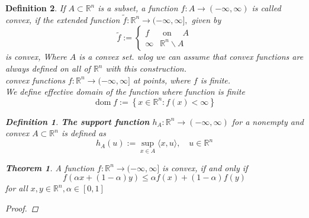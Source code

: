 \documentclass[oneside]{book}
\newtheorem{theorem}{Theorem}[section]
\newtheorem{mydef}{Definition}
\begin{document}
\begin{mydef}
 If $A \subset \mathbb{R}^{n}$ is a subset, a function $f: A \rightarrow(-\infty, \infty)$ is called convex, if the extended function $\tilde{f}: \mathbb{R}^{n} \rightarrow(-\infty, \infty],$ given by
$$
\tilde{f}:=\left\{\begin{array}{ll}
f & \text { on } \quad A \\
\infty & \mathbb{R}^{n} \backslash A
\end{array}\right.
$$
is convex,  Where  $A$ is a convex set. wlog we can assume that convex functions are always defined on all of $\mathbb{R}^{n}$ with this construction.\\
convex functions $f: \mathbb{R}^{n} \rightarrow(-\infty, \infty]$ at points, where $f$ is finite. \\
We define effective domain of the function where function is finite
$$
\operatorname{dom} f:=\left\{x \in \mathbb{R}^{n}: f(x)<\infty\right\}
$$



\begin{mydef} \label{d:10}
 \textbf{The support function }$h_{A}: \mathbb{R}^{n} \rightarrow(-\infty, \infty) $  for a nonempty and convex $A \subset \mathbb{R}^{n}$ is defined as
$$
h_{A}(u):=\sup _{x \in A}\langle x, u\rangle, \quad u \in \mathbb{R}^{n}
$$

\end{mydef}




\begin{theorem}
\label{t:7}
 A function $f: \mathbb{R}^{n} \rightarrow(-\infty, \infty]$ is convex, if and only if
$$
f(\alpha x+(1-\alpha) y) \leq \alpha f(x)+(1-\alpha) f(y)
$$
for all $x, y \in \mathbb{R}^{n}, \alpha \in[0,1]$
\begin{proof}


\end{proof}
\end{theorem}
\end{mydef}
\end{document}
